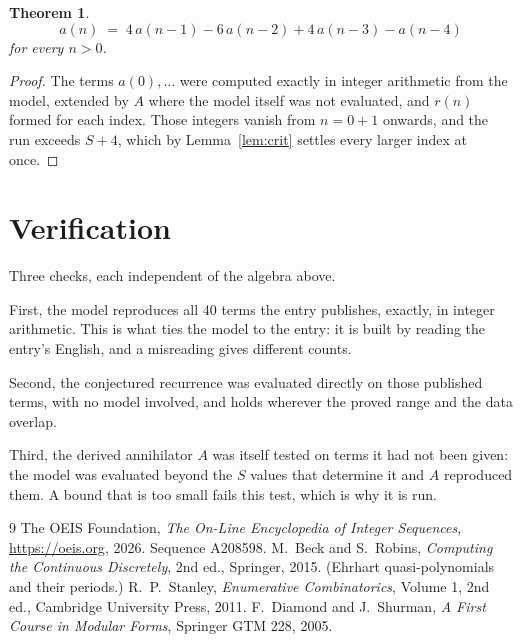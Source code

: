 \documentclass[11pt,a4paper]{article}
\theoremstyle{plain}
\newtheorem{theorem}{Theorem}
\theoremstyle{definition}
\begin{document}
\begin{theorem}
\[
a(n)\;=\;4\,a(n-1) - 6\,a(n-2) + 4\,a(n-3) - a(n-4)
\]
for every $n>0$.
\end{theorem}

\begin{proof}
The terms $a(0),\dots$ were computed exactly in integer arithmetic from the model, extended by
$A$ where the model itself was not evaluated, and $r(n)$ formed for each index. Those integers
vanish from $n=0+1$ onwards, and the run exceeds $S+4$, which by
Lemma~\ref{lem:crit} settles every larger index at once.
\end{proof}

\section{Verification}

Three checks, each independent of the algebra above.

First, the model reproduces all $40$ terms the entry publishes, exactly, in integer
arithmetic. This is what ties the model to the entry: it is built by reading the entry's
English, and a misreading gives different counts.

Second, the conjectured recurrence was evaluated directly on those published terms, with no
model involved, and holds wherever the proved range and the data overlap.

Third, the derived annihilator $A$ was itself tested on terms it had not been given: the model
was evaluated beyond the $S$ values that determine it and $A$ reproduced them. A bound that is
too small fails this test, which is why it is run.

\begin{thebibliography}{9}
 The OEIS Foundation, \emph{The On-Line Encyclopedia of Integer
Sequences}, \url{https://oeis.org}, 2026. Sequence A208598.
 M.~Beck and S.~Robins, \emph{Computing the Continuous Discretely},
2nd ed., Springer, 2015. (Ehrhart quasi-polynomials and their periods.)
 R.~P.~Stanley, \emph{Enumerative Combinatorics}, Volume 1, 2nd ed.,
Cambridge University Press, 2011.
 F.~Diamond and J.~Shurman, \emph{A First Course in Modular Forms},
Springer GTM 228, 2005.
\end{thebibliography}
\end{document}
